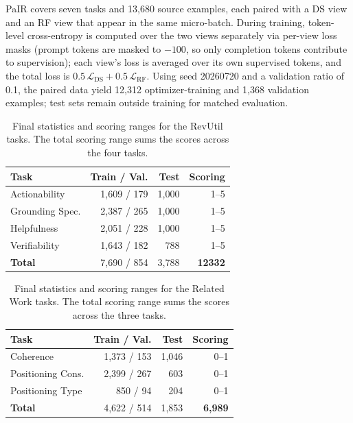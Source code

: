 PaIR covers seven tasks and 13,680 source examples, each paired with a DS
view and an RF view that appear in the same micro-batch. During training,
token-level cross-entropy is computed over the two views separately via
per-view loss masks (prompt tokens are masked to \(-100\), so only completion
tokens contribute to supervision); each view's loss is averaged over its own
supervised tokens, and the total loss is
\(0.5\,\mathcal{L}_{\mathrm{DS}} + 0.5\,\mathcal{L}_{\mathrm{RF}}\).
Using seed 20260720 and a validation ratio of 0.1, the paired data yield
12,312 optimizer-training and 1,368 validation examples; test sets remain
outside training for matched evaluation.

\begin{table}[H]
\centering
\small
\begin{tabular}{lrrr}
\toprule
\textbf{Task} & Train / Val. & Test & Scoring \\
\midrule
Actionability & 1,609 / 179 & 1,000 & 1--5 \\
Grounding Spec. & 2,387 / 265 & 1,000 & 1--5 \\
Helpfulness & 2,051 / 228 & 1,000 & 1--5 \\
Verifiability & 1,643 / 182 & 788 & 1--5 \\
\midrule
\textbf{Total} & 7,690 / 854 & 3,788 & \textbf{12332} \\
\bottomrule
\end{tabular}
\caption{Final statistics and scoring ranges for the RevUtil tasks. 
The total scoring range sums the scores across the four tasks.}
\label{tab:rev-util-data-size}
\end{table}

\begin{table}[H]
\centering
\small
\begin{tabular}{lrrr}
\toprule
\textbf{Task} & Train / Val. & Test & Scoring \\
\midrule
Coherence & 1,373 / 153 & 1,046 & 0--1 \\
Positioning Cons. & 2,399 / 267 & 603 & 0--1 \\
Positioning Type & 850 / 94 & 204 & 0--1 \\
\midrule
\textbf{Total} & 4,622 / 514 & 1,853 & \textbf{6,989} \\
\bottomrule
\end{tabular}
\caption{Final statistics and scoring ranges for the Related Work tasks. 
The total scoring range sums the scores across the three tasks.}
\label{tab:rw-data-size}
\end{table}
